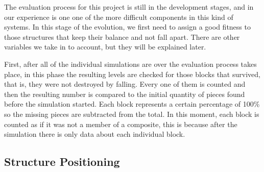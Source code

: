 \documentclass[conference]{IEEEtran}
\begin{document}
    The evaluation process for this project is still in the development stages,
    and in our experience is one one of the more difficult components in this
    kind of systems. In this stage of the evolution, we first need to assign a
    good fitness to those structures that keep their balance and not fall apart.
    There are other variables we take in to account, but they will be explained
    later. 
    
    
    
    First, after all of the individual simulations are over the evaluation
    process takes place, in this phase the resulting levels are checked for those
    blocks that survived, that is,  they were not destroyed by falling. Every one of them
    is counted and then the resulting number is compared to the initial quantity
    of pieces found before the simulation started. Each block represents a certain percentage
    of 100\% so the missing pieces are subtracted from the total. In this
    moment, each block is counted as if it was not a member of a composite, this
    is because after the simulation there is only data about each individual block. 


    \subsection{Structure Positioning}
\end{document}
